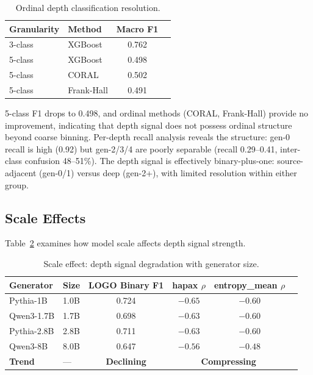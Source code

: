 \documentclass[11pt,a4paper]{article}
\begin{document}
\begin{table}[t]
\centering
\small
\caption{Ordinal depth classification resolution.}
\label{tab:ordinal}
\begin{tabular}{llcc}
\toprule
Granularity & Method & Macro F1 \\
\midrule
3-class & XGBoost & 0.762 \\
5-class & XGBoost & 0.498 \\
5-class & CORAL & 0.502 \\
5-class & Frank-Hall & 0.491 \\
\bottomrule
\end{tabular}
\end{table}

5-class F1 drops to 0.498, and ordinal methods (CORAL, Frank-Hall) provide no improvement, indicating that depth signal does not possess ordinal structure beyond coarse binning. Per-depth recall analysis reveals the structure: gen-0 recall is high (0.92) but gen-2/3/4 are poorly separable (recall 0.29--0.41, inter-class confusion 48--51\%). The depth signal is effectively binary-plus-one: source-adjacent (gen-0/1) versus deep (gen-2+), with limited resolution within either group.

\subsection{Scale Effects}

Table~\ref{tab:scale} examines how model scale affects depth signal strength.

\begin{table}[t]
\centering
\small
\caption{Scale effect: depth signal degradation with generator size.}
\label{tab:scale}
\begin{tabular}{llcccc}
\toprule
Generator & Size & LOGO Binary F1 & hapax $\rho$ & entropy\_mean $\rho$ \\
\midrule
Pythia-1B & 1.0B & 0.724 & $-0.65$ & $-0.60$ \\
Qwen3-1.7B & 1.7B & 0.698 & $-0.63$ & $-0.60$ \\
Pythia-2.8B & 2.8B & 0.711 & $-0.63$ & $-0.60$ \\
Qwen3-8B & 8.0B & 0.647 & $-0.56$ & $-0.48$ \\
\midrule
\textbf{Trend} & --- & \textbf{Declining} & \multicolumn{2}{c}{\textbf{Compressing}} \\
\bottomrule
\end{tabular}
\end{table}
\end{document}
